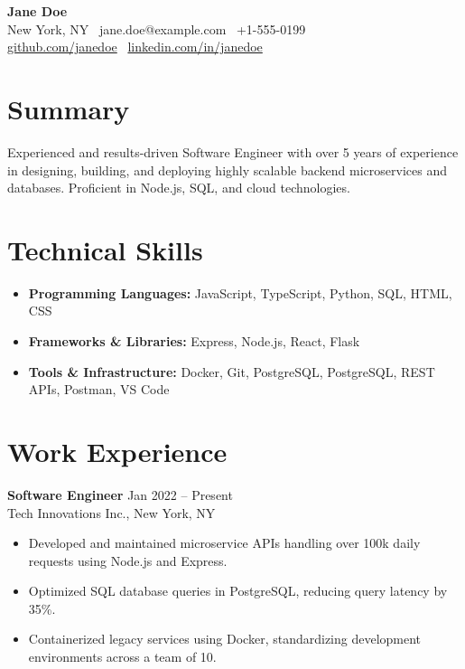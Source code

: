 \documentclass[11pt,a4paper]{article}
\begin{document}
\begin{center}
    {\huge \textbf{Jane Doe}} \\
    New York, NY \textbullet\ jane.doe@example.com \textbullet\ +1-555-0199 \\
    \href{https://github.com/janedoe}{github.com/janedoe} \textbullet\ \href{https://linkedin.com/in/janedoe}{linkedin.com/in/janedoe}
\end{center}

\section*{Summary}
Experienced and results-driven Software Engineer with over 5 years of experience in designing, building, and deploying highly scalable backend microservices and databases. Proficient in Node.js, SQL, and cloud technologies.

\section*{Technical Skills}
\begin{itemize}[noitemsep,topsep=0pt]
    \item \textbf{Programming Languages:} JavaScript, TypeScript, Python, SQL, HTML, CSS
    \item \textbf{Frameworks \& Libraries:} Express, Node.js, React, Flask
    \item \textbf{Tools \& Infrastructure:} Docker, Git, PostgreSQL, PostgreSQL, REST APIs, Postman, VS Code
\end{itemize}

\section*{Work Experience}
\textbf{Software Engineer} \hfill Jan 2022 -- Present \\
Tech Innovations Inc., New York, NY
\begin{itemize}[noitemsep,topsep=0pt]
    \item Developed and maintained microservice APIs handling over 100k daily requests using Node.js and Express.
    \item Optimized SQL database queries in PostgreSQL, reducing query latency by 35\%.
    \item Containerized legacy services using Docker, standardizing development environments across a team of 10.
\end{itemize}
\end{document}
